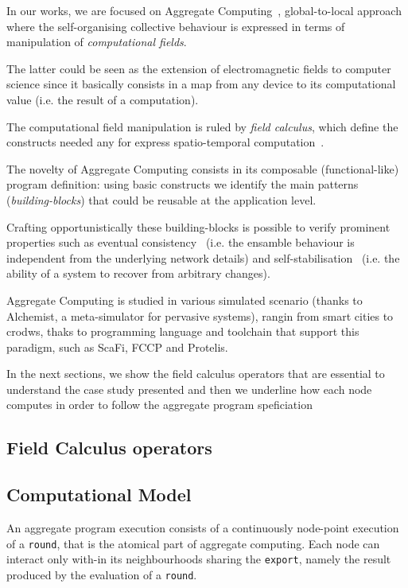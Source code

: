 \documentclass[conference]{IEEEtran}
\newcommand{\round}{\texttt{round}}
\newcommand{\export}{\texttt{export}}
\begin{document}
In our works, we are focused on Aggregate Computing~\cite{DBLP:journals/computer/BealPV15}, global-to-local approach where
 the self-organising collective behaviour is expressed in terms of manipulation of \textit{computational fields}.

The latter could be seen as the extension of electromagnetic fields to computer science since it basically consists in a 
 map from any device to its computational value (i.e. the result of a computation).

The computational field manipulation is ruled by \textit{field calculus}, which define the constructs needed 
 any for express spatio-temporal computation~\cite{DBLP:conf/coordination/AudritoBDV18}.

The novelty of Aggregate Computing consists in its composable (functional-like) program definition: using basic constructs
 we identify the main patterns (\textit{building-blocks}) that could be reusable at the application level.

Crafting opportunistically these building-blocks is possible to verify prominent properties such as eventual consistency~\cite{DBLP:journals/taas/BealVPD17} (i.e. the ensamble behaviour is independent from the underlying network details)
 and self-stabilisation~\cite{DBLP:journals/tomacs/ViroliABDP18} (i.e. the ability of a system to recover from arbitrary changes).

Aggregate Computing is studied in various simulated scenario (thanks to Alchemist, a meta-simulator for pervasive systems), rangin from smart cities to crodws, thaks to programming language and toolchain that support 
 this paradigm, such as ScaFi, FCCP and Protelis.

In the next sections, we show the field calculus operators that are essential to understand the case study presented and then
 we underline how each node computes in order to follow the aggregate program speficiation 
\subsection{Field Calculus operators}

\subsection{Computational Model}
An aggregate program execution consists of a continuously node-point execution of a \round{}, 
 that is the atomical part of aggregate computing.
%
Each node can interact only with-in its neighbourhoods sharing the \export{}, 
 namely the result produced by the evaluation of a \round{}.
\end{document}
